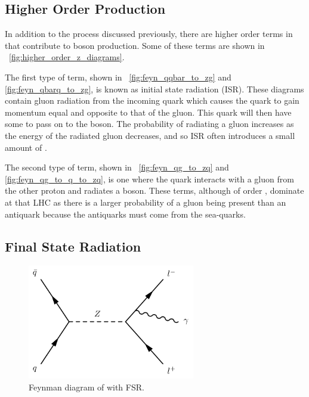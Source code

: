 

\subsection{Higher Order Production}

In addition to the \DrellYan process discussed previously, there are higher
order terms in \alphastrong that contribute to \Z boson production. Some of
these terms are shown in \FIG~\ref{fig:higher_order_z_diagrams}.

The first type of term, shown in \FIGS~\ref{fig:feyn_qqbar_to_zg} and
\ref{fig:feyn_qbarq_to_zg}, is known as initial state radiation (ISR). These
diagrams contain gluon radiation from the incoming quark which causes the quark
to gain momentum equal and opposite to that of the gluon. This quark will then
have some \pt to pass on to the \Z boson. The probability of radiating a gluon
increases as the energy of the radiated gluon decreases, and so ISR often
introduces a small amount of \bosonpt.

The second type of term, shown in \FIGS~\ref{fig:feyn_qg_to_zq} and
\ref{fig:feyn_qg_to_q_to_zq}, is one where the quark interacts with a gluon
from the other proton and radiates a \Z boson. These terms, although of order
\alphastrong, dominate at that LHC as there is a larger probability of a gluon
being present than an antiquark because the antiquarks must come from the
sea-quarks.



\subsection{Final State Radiation}
\label{sec:electron_dressing}

\begin{figure}[!htb]
    \centering
    \includegraphics[width=0.65\textwidth]{figures/fsr.pdf}
    \caption{
        Feynman diagram of \Ztoll with FSR.
    }
    \label{fig:fsr_diagram}
\end{figure}

